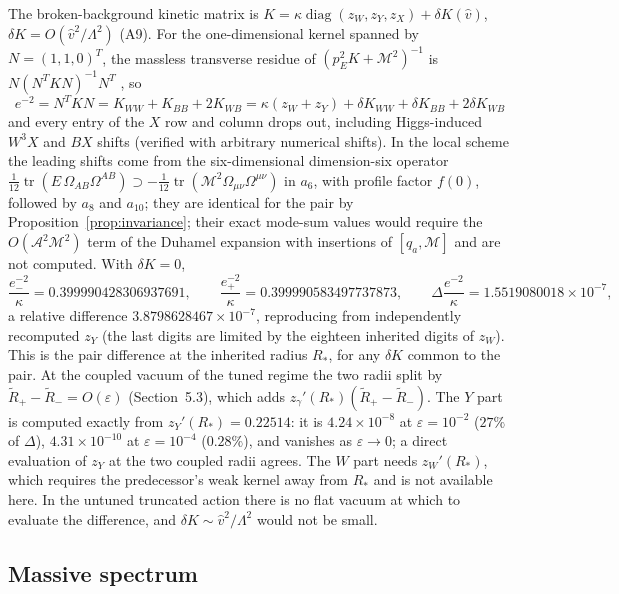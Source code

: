 \documentclass[11pt,letterpaper]{article}
\DeclareMathOperator{\tr}{tr}
\DeclareMathOperator{\diag}{diag}
\newcommand{\Mb}{\mathcal M}
\newcommand{\Lam}{\Lambda}
\begin{document}
The broken-background kinetic matrix is $K=\kappa\diag(z_W,z_Y,z_X)+\delta K(\hat v)$, $\delta K=O(\hat v^2/\Lam^2)$ (A9). For the one-dimensional kernel spanned by $N=(1,1,0)^{T}$, the massless transverse residue of $(p_E^2K+\Mb^2)^{-1}$ is $N(N^{T}KN)^{-1}N^{T}$ \cite{neutral}, so
\begin{equation}
\boxed{\ e^{-2}=N^{T}KN=K_{WW}+K_{BB}+2K_{WB}=\kappa(z_W+z_Y)+\delta K_{WW}+\delta K_{BB}+2\delta K_{WB}\ }
\end{equation}
and every entry of the $X$ row and column drops out, including Higgs-induced $W^3X$ and $BX$ shifts (verified with arbitrary numerical shifts). In the local scheme the leading shifts come from the six-dimensional dimension-six operator $\tfrac1{12}\tr(E\,\Omega_{AB}\Omega^{AB})\supset-\tfrac1{12}\tr(\Mb^2\Omega_{\mu\nu}\Omega^{\mu\nu})$ in $a_6$, with profile factor $f(0)$, followed by $a_8$ and $a_{10}$; they are identical for the pair by Proposition~\ref{prop:invariance}; their exact mode-sum values would require the $O(\mathcal A^2\Mb^2)$ term of the Duhamel expansion with insertions of $[q_a,\Mb]$ and are not computed. With $\delta K=0$,
\begin{equation}
\frac{e^{-2}_-}{\kappa}=0.399990428306937691,\qquad
\frac{e^{-2}_+}{\kappa}=0.399990583497737873,\qquad
\Delta\frac{e^{-2}}\kappa=1.5519080018\times10^{-7},
\end{equation}
a relative difference $3.8798628467\times10^{-7}$, reproducing \cite{neutral} from independently recomputed $z_Y$ (the last digits are limited by the eighteen inherited digits of $z_W$). This is the pair difference at the inherited radius $R_*$, for any $\delta K$ common to the pair. At the coupled vacuum of the tuned regime the two radii split by $\tilde R_+-\tilde R_-=O(\varepsilon)$ (Section~5.3), which adds $z_\gamma'(R_*)(\tilde R_+-\tilde R_-)$. The $Y$ part is computed exactly from $z_Y'(R_*)=0.22514$: it is $4.24\times10^{-8}$ at $\varepsilon=10^{-2}$ ($27\%$ of $\Delta$), $4.31\times10^{-10}$ at $\varepsilon=10^{-4}$ ($0.28\%$), and vanishes as $\varepsilon\to0$; a direct evaluation of $z_Y$ at the two coupled radii agrees. The $W$ part needs $z_W'(R_*)$, which requires the predecessor's weak kernel away from $R_*$ and is not available here. In the untuned truncated action there is no flat vacuum at which to evaluate the difference, and $\delta K\sim\hat v^2/\Lam^2$ would not be small.

\subsection{Massive spectrum}
\end{document}
